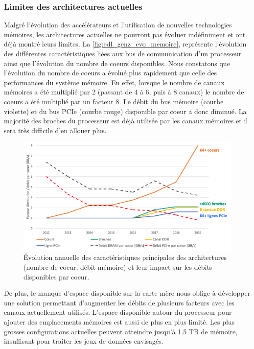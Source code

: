     \subsubsection{Limites des architectures actuelles}
        Malgré l'évolution des accélérateurs et l'utilisation de nouvelles technologies mémoires, les architectures actuelles ne pourront pas évoluer indéfiniment et ont déjà montré leurs limites. La \autoref{fig:edl_genz_evo_memoire}, représente l'évolution des différentes caractéristiques liées aux bus de communication d'un processeur ainsi que l'évolution du nombre de coeurs disponibles. Nous constatons que l'évolution du nombre de coeurs a évolué plus rapidement que celle des performances du système mémoire. En effet, lorsque le nombre de canaux mémoires a été multiplié par 2 (passant de 4 à 6, puis à 8 canaux) le nombre de coeurs a été multiplié par un facteur 8.  Le débit du bus mémoire (courbe violette) et du bus PCIe (courbe rouge) disponible par coeur a donc diminué. La majorité des broches du processeur est déjà utilisée par les canaux mémoires et il sera très difficile d'en allouer plus. 
        
            \begin{figure}
            \center
            \includegraphics[width=14cm]{images/edl_genz_evo_memoire.png}
            \caption{\label{fig:edl_genz_evo_memoire} Évolution annuelle des caractéristiques principales des architectures (nombre de coeur, débit mémoire) et leur impact sur les débits disponibles par coeur.}
            \end{figure}
            
        
        De plus, le manque d'espace disponible sur la carte mère nous oblige à développer une solution permettant d'augmenter les débits de plusieurs facteurs avec les canaux actuellement utilisés. 
        L'espace disponible autour du processeur pour ajouter des emplacements mémoires est aussi de plus en plus limité. Les plus grosses configurations actuelles peuvent atteindre jusqu'à 1.5 TB de mémoire, insuffisant pour traiter les jeux de données envisagés.
    
